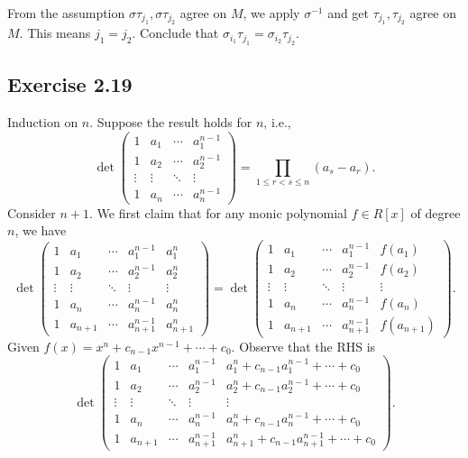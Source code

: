 \documentclass[../Marcus.tex]{subfiles}
\begin{document}
From the assumption $\sigma\tau_{j_1},\sigma\tau_{j_2}$ agree on $M$, we apply $\sigma^{-1}$ and get $\tau_{j_1},\tau_{j_2}$ agree on $M$. This means $j_1=j_2$. Conclude that $\sigma_{i_1}\tau_{j_1}=\sigma_{i_2}\tau_{j_2}$.

\subsection*{Exercise 2.19}

Induction on $n$. Suppose the result holds for $n$, i.e.,
$$
\det\begin{pmatrix}
    1           & a_1      & \cdots & a_1^{n-1} \\
    1           & a_2     & \cdots & a_2^{n-1} \\
    \vdots & \vdots & \ddots & \vdots \\
    1          & a_n      & \cdots & a_n^{n-1}
\end{pmatrix}
=\prod_{1\leq r<s\leq n}(a_s-a_r).
$$
Consider $n+1$. We first claim that for any monic polynomial $f\in R[x]$ of degree $n$, we have
$$
\det\begin{pmatrix}
    1           & a_1       & \cdots & a_1^{n-1}         & a_1^n \\
    1           & a_2       & \cdots & a_2^{n-1}        & a_2^n \\
    \vdots & \vdots   & \ddots & \vdots              & \vdots \\
    1          & a_n        & \cdots & a_n^{n-1}        & a_n^n \\
    1          & a_{n+1} & \cdots & a_{n+1}^{n-1} & a_{n+1}^n
\end{pmatrix}
=
\det\begin{pmatrix}
    1           & a_1        & \cdots & a_1^{n-1}       & f(a_1)\\
    1           & a_2       & \cdots & a_2^{n-1}       & f(a_2) \\
    \vdots & \vdots   & \ddots & \vdots              & \vdots \\
    1          & a_n        & \cdots & a_n^{n-1}        & f(a_n) \\
    1          & a_{n+1} & \cdots & a_{n+1}^{n-1} & f(a_{n+1})
\end{pmatrix}.
$$
Given $f(x)=x^n+c_{n-1}x^{n-1}+\cdots+c_0$. Observe that the RHS is
$$
\det\begin{pmatrix}
    1          & a_1         & \cdots & a_1^{n-1}        & a_1^n+c_{n-1}a_1^{n-1}+\cdots+c_0\\
    1          & a_2        & \cdots & a_2^{n-1}        & a_2^n+c_{n-1}a_2^{n-1}+\cdots+c_0 \\
    \vdots & \vdots   & \ddots & \vdots              & \vdots \\
    1          & a_n        & \cdots & a_n^{n-1}        & a_n^n+c_{n-1}a_n^{n-1}+\cdots+c_0 \\
    1          & a_{n+1} & \cdots & a_{n+1}^{n-1} & a_{n+1}^n+c_{n-1}a_{n+1}^{n-1}+\cdots+c_0
\end{pmatrix}.
$$
\end{document}

